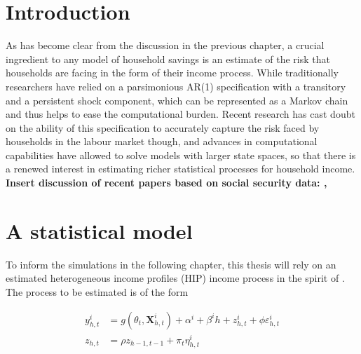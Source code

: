 \section{Introduction}
As has become clear from the discussion in the previous chapter, a crucial
ingredient to any model of household savings is an estimate of the risk that
households are facing in the form of their income process. While traditionally
researchers have relied on a parsimonious AR(1) specification with a transitory
and a persistent shock component, which can be represented as a Markov chain
and thus helps to ease the computational burden. Recent research has cast doubt
on the ability of this specification to accurately capture the risk faced by
households in the labour market though, and advances in computational
capabilities have allowed to solve models with larger state spaces, so that
there is a renewed interest in estimating richer statistical processes for
household income. \vspace{1cm}
\\
\textbf{Insert discussion of recent papers based on social security data:
\citet{GKOS2015}, \citet{DHPRV2013}}

\section{A statistical model}
To inform the simulations in the following chapter, this thesis will rely on an
estimated heterogeneous income profiles (HIP) income process in the spirit of
\citet{Guvenen2009}. The process to be estimated is of the form

\begin{align}
y_{h,t}^i &= g(\theta_t, \pmb{X}_{h,t}^i) + \alpha^i + \beta^i h + z_{h,t}^i + \phi \varepsilon_{h,t}^i \label{incproc} \\
z_{h,t} &= \rho z_{h-1,t-1} + \pi_t \eta_{h,t}^i \label{persshock}
\end{align}

